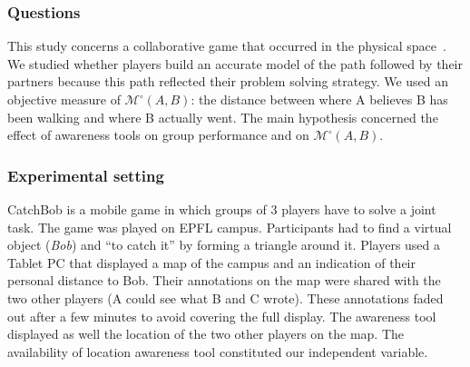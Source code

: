 \documentclass[twocolumn]{article}
\newcommand{\gModel}[2]{{$\mathcal{M}^{\circ}(#1, #2)$}}
\begin{document}
\subsubsection*{Questions}

This study concerns a collaborative game that occurred in the physical
space~\citep{nova2006underwhelming}. We studied whether players build an accurate
model of the path followed by their partners because this path reflected their
problem solving strategy. We used an objective measure of \gModel{A}{B}: the
distance between where A believes B has been walking and where B actually went.
The main hypothesis concerned the effect of awareness tools on group performance
and on \gModel{A}{B}. 

\subsubsection*{Experimental setting}

{\sc CatchBob} is a mobile game in which groups of 3 players have to solve a
joint task. The game was played on EPFL campus. Participants had to find a
virtual object (\emph{Bob}) and ``to catch it'' by forming a triangle around it.
Players used a Tablet PC that displayed a map of the campus and an indication of
their personal distance to Bob. Their annotations on the map were shared with
the two other players (A could see what B and C wrote). These annotations faded
out after a few minutes to avoid covering the full display. The awareness tool
displayed as well the location of the two other players on the map. The
availability of location awareness tool constituted our independent variable.
\end{document}
